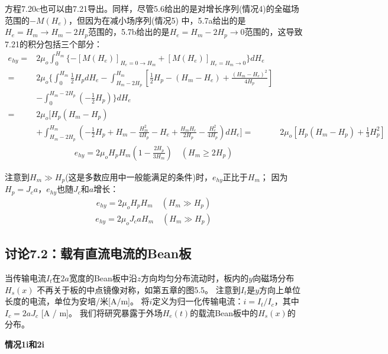 方程7.20c也可以由7.21导出。同样，尽管5.6给出的是对增长序列(情况4)的全磁场范围的$-M(H_e)$，但因为在减小场序列(情况5)
中，5.7a给出的是$H_e=H_m\rightarrow H_m-2H_p$范围的，5.7b给出的是$H_e=H_m-2H_p\rightarrow 0$范围的，这导致
7.21的积分包括三个部分：
\begin{align*}%
e_{hy}=&2\mu_o\int_{0}^{H_m}\{-[M(H_e)]_{H_e=0\rightarrow H_m}+[M(H_e)]_{H_e=H_m\rightarrow 0}\}dH_e \\\tag{7.21}
=&2\mu_o\{\int_{0}^{H_m}\frac{1}{2}H_pdH_e 
-\int_{H_m-2H_p}^{H_m}\left[\frac{1}{2}H_p-(H_m-H_e)+\frac{(H_m-H_e)^2}{4H_p}\right]\\
&-\int_{0}^{H_m-2H_p}(-\frac{1}{2}H_p)\}dH_e\\ 
=&2\mu_o\big[H_p(H_m-H_p)\\ 
&+\int_{H_m-2H_p}^{H_m}\left(-\frac{1}{2}H_p+H_m-\frac{H_{m}^{2}}{4H_p}-H_e+\frac{H_mH_e}{2H_p}-\frac{H_{e}^{2}}{4H_p}\right)dH_e\big] 
=&2\mu_o[H_p(H_m-H_p)+\frac{1}{3}H_{p}^{2}]
\end{align*}
\begin{align*}
e_{hy}=2\mu_oH_pH_m\left(1-\frac{2H_p}{3H_m}\right)   \quad  (H_m\geq 2H_p) \tag{7.20c}
\end{align*}

注意到$H_m\gg H_p$(这是多数应用中一般能满足的条件)时，$e_{hy}$正比于$H_m$；
因为$H_p=J_c a$，$e_{hy}$也随$J_c$和$a$增长：
\begin{align*}%
e_{hy}=2\mu_oH_pH_m \quad  (H_m\gg H_p) \tag{7.20d}
\end{align*}
\begin{align*}
e_{hy}=2\mu_oJ_caH_m \quad (H_m\gg H_p) \tag{7.20e}
\end{align*}


\subsection{讨论7.2：载有直流电流的Bean板}
当传输电流$I_t$在$2a$宽度的Bean板中沿$z$方向均匀分布流动时，板内的$y$向磁场分布$H_s(x)$
不再关于板的中点镜像对称，如第五章的图5.5。
注意到$I_t$是$y$方向上单位长度的电流，单位为安培/米[A/m]。
将$i$定义为归一化传输电流：$i= I_t / I_c$，其中$I_c = 2a J_c$ [A / m]。 我们将研究暴露于外场$H_e(t)$的载流Bean板中的$H_s(x)$的分布。

\textbf{情况1i和2i}

